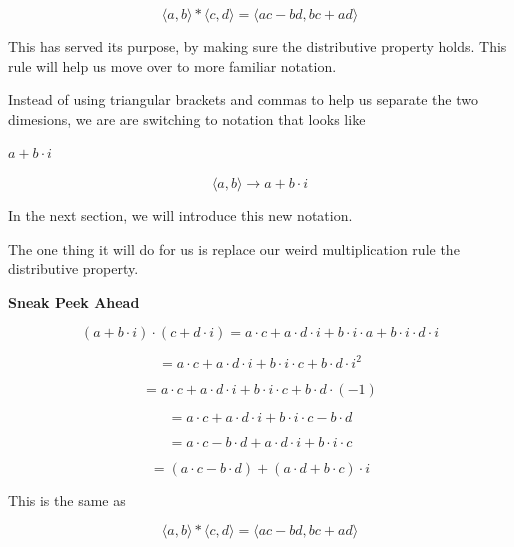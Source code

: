 \documentclass{ximera}
\begin{document}
\[    \langle a, b \rangle  * \langle c, d \rangle =   \langle a c - b d, b c + a d \rangle   \]



This has served its purpose, by making sure the distributive property holds.  This rule will help us move over to more familiar notation.


Instead of using triangular brackets and commas to help us separate the two dimesions, we are are switching to notation that looks like 






\begin{center}
\textbf{\textcolor{blue!55!black}{$a + b \cdot i$}} 
\end{center}




\[    \langle a, b \rangle  \rightarrow   a + b \cdot i   \]






In the next section, we will introduce this new notation.  

The one thing it will do for us is replace our weird multiplication rule the distributive property.



\begin{idea} \textbf{\textcolor{blue!55!black}{Sneak Peek Ahead}} 

\[    (a + b \cdot i) \cdot (c + d \cdot i) = a \cdot c + a \cdot d \cdot i + b \cdot i \cdot a +  b \cdot i \cdot d \cdot i \]


\[    = a \cdot c + a \cdot d \cdot i + b \cdot i \cdot c +  b \cdot d \cdot i^2 \]

\[    = a \cdot c + a \cdot d \cdot i + b \cdot i \cdot c +  b \cdot d \cdot (-1) \]

\[    = a \cdot c + a \cdot d \cdot i + b \cdot i \cdot c -  b \cdot d  \]

\[    = a \cdot c -  b \cdot d + a \cdot d \cdot i + b \cdot i \cdot c   \]

\[    = (a \cdot c -  b \cdot d) + (a \cdot d  + b \cdot c) \cdot i   \]



\end{idea}



This is the same as


\[    \langle a, b \rangle  * \langle c, d \rangle =   \langle a c - b d, b c + a d \rangle   \]
\end{document}
